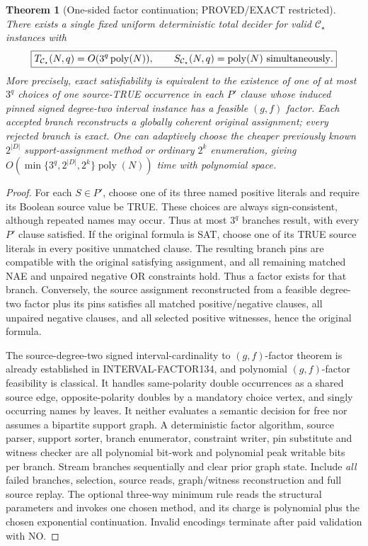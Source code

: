 \documentclass[11pt]{article}
\newtheorem{theorem}{Theorem}
\newcommand{\CS}{\mathcal C_{\star}}
\begin{document}
\begin{theorem}[One-sided factor continuation; PROVED/EXACT restricted]
There exists a \emph{single fixed uniform deterministic total decider} for valid $\CS$ instances with
\[
\boxed{T_{\CS}(N,q)=O(3^q\operatorname{poly}(N)),\qquad
 S_{\CS}(N,q)=\operatorname{poly}(N)\ {\rm simultaneously}.}
\]
More precisely, exact satisfiability is equivalent to the existence of one of at most $3^q$ choices of one source-TRUE occurrence in each $P'$ clause whose induced pinned signed degree-two interval instance has a feasible $(g,f)$ factor. Each accepted branch reconstructs a globally coherent original assignment; every rejected branch is exact. One can adaptively choose the cheaper previously known $2^{|D|}$ support-assignment method or ordinary $2^k$ enumeration, giving $O(\min\{3^q,2^{|D|},2^k\}\operatorname{poly}(N))$ time with polynomial space.
\end{theorem}
\begin{proof}
For each $S\in P'$, choose one of its three named positive literals and require its Boolean source value be TRUE. These choices are always sign-consistent, although repeated names may occur. Thus at most $3^q$ branches result, with every $P'$ clause satisfied. If the original formula is SAT, choose one of its TRUE source literals in every positive unmatched clause. The resulting branch pins are compatible with the original satisfying assignment, and all remaining matched NAE and unpaired negative OR constraints hold. Thus a factor exists for that branch. Conversely, the source assignment reconstructed from a feasible degree-two factor plus its pins satisfies all matched positive/negative clauses, all unpaired negative clauses, and all selected positive witnesses, hence the original formula.

The source-degree-two signed interval-cardinality to $(g,f)$-factor theorem is already established in INTERVAL-FACTOR134, and polynomial $(g,f)$-factor feasibility is classical. It handles same-polarity double occurrences as a shared source edge, opposite-polarity doubles by a mandatory choice vertex, and singly occurring names by leaves. It neither evaluates a semantic decision for free nor assumes a bipartite support graph. A deterministic factor algorithm, source parser, support sorter, branch enumerator, constraint writer, pin substitute and witness checker are all polynomial bit-work and polynomial peak writable bits per branch. Stream branches sequentially and clear prior graph state. Include \emph{all} failed branches, selection, source reads, graph/witness reconstruction and full source replay. The optional three-way minimum rule reads the structural parameters and invokes one chosen method, and its charge is polynomial plus the chosen exponential continuation. Invalid encodings terminate after paid validation with NO.
\end{proof}
\end{document}
